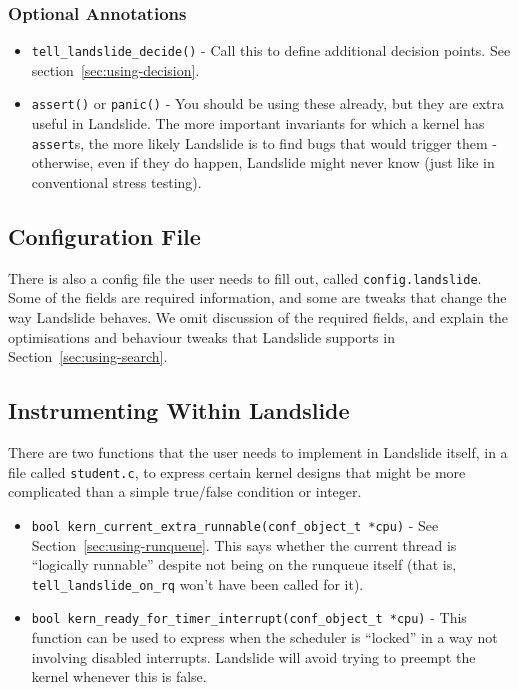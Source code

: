 \subsubsection{Optional Annotations}
\begin{itemize}
	\small
	\item \texttt{tell\_landslide\_decide()} - Call this to define additional decision points. See section~\ref{sec:using-decision}.
	\item \texttt{assert()} or \texttt{panic()} - You should be using these already, but they are extra useful in Landslide.
		The more important invariants for which a kernel has \texttt{assert}s, the more likely Landslide is to find bugs that would trigger them - otherwise, even if they do happen, Landslide might never know (just like in conventional stress testing).
\end{itemize}

\subsection{Configuration File}
\label{sec:using-config-landslide}

There is also a config file the user needs to fill out, called \texttt{config.landslide}. Some of the fields are required information, and some are tweaks that change the way Landslide behaves. We omit discussion of the required fields, and explain the optimisations and behaviour tweaks that Landslide supports in Section~\ref{sec:using-search}.

\subsection{Instrumenting Within Landslide}
\label{sec:using-student-c}

There are two functions that the user needs to implement in Landslide itself, in a file called \texttt{student.c}, to express certain kernel designs that might be more complicated than a simple true/false condition or integer.

\begin{itemize}
	\small
        \item \texttt{bool kern\_current\_extra\_runnable(conf\_object\_t *cpu)} - See Section~\ref{sec:using-runqueue}. This says whether the current thread is ``logically runnable'' despite not being on the runqueue itself (that is, \texttt{tell\_landslide\_on\_rq} won't have been called for it).
        \item \texttt{bool kern\_ready\_for\_timer\_interrupt(conf\_object\_t *cpu)} - This function can be used to express when the scheduler is ``locked'' in a way not involving disabled interrupts. Landslide will avoid trying to preempt the kernel whenever this is false.
\end{itemize}

